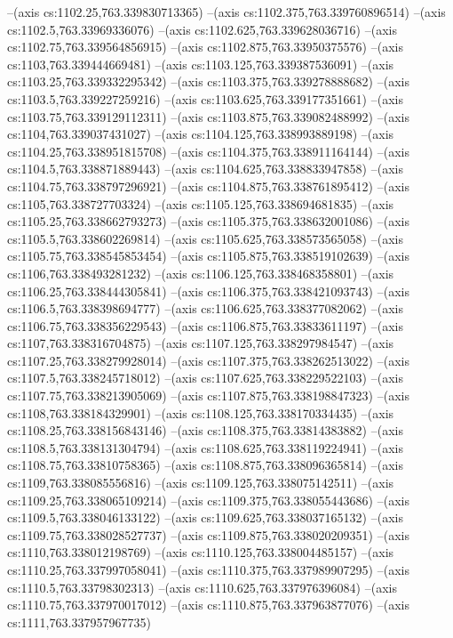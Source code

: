 --(axis cs:1102.25,763.339830713365)
--(axis cs:1102.375,763.339760896514)
--(axis cs:1102.5,763.33969336076)
--(axis cs:1102.625,763.339628036716)
--(axis cs:1102.75,763.339564856915)
--(axis cs:1102.875,763.33950375576)
--(axis cs:1103,763.339444669481)
--(axis cs:1103.125,763.339387536091)
--(axis cs:1103.25,763.339332295342)
--(axis cs:1103.375,763.339278888682)
--(axis cs:1103.5,763.339227259216)
--(axis cs:1103.625,763.339177351661)
--(axis cs:1103.75,763.339129112311)
--(axis cs:1103.875,763.339082488992)
--(axis cs:1104,763.339037431027)
--(axis cs:1104.125,763.338993889198)
--(axis cs:1104.25,763.338951815708)
--(axis cs:1104.375,763.338911164144)
--(axis cs:1104.5,763.338871889443)
--(axis cs:1104.625,763.338833947858)
--(axis cs:1104.75,763.338797296921)
--(axis cs:1104.875,763.338761895412)
--(axis cs:1105,763.338727703324)
--(axis cs:1105.125,763.338694681835)
--(axis cs:1105.25,763.338662793273)
--(axis cs:1105.375,763.338632001086)
--(axis cs:1105.5,763.338602269814)
--(axis cs:1105.625,763.338573565058)
--(axis cs:1105.75,763.338545853454)
--(axis cs:1105.875,763.338519102639)
--(axis cs:1106,763.338493281232)
--(axis cs:1106.125,763.338468358801)
--(axis cs:1106.25,763.338444305841)
--(axis cs:1106.375,763.338421093743)
--(axis cs:1106.5,763.338398694777)
--(axis cs:1106.625,763.338377082062)
--(axis cs:1106.75,763.338356229543)
--(axis cs:1106.875,763.33833611197)
--(axis cs:1107,763.338316704875)
--(axis cs:1107.125,763.338297984547)
--(axis cs:1107.25,763.338279928014)
--(axis cs:1107.375,763.338262513022)
--(axis cs:1107.5,763.338245718012)
--(axis cs:1107.625,763.338229522103)
--(axis cs:1107.75,763.338213905069)
--(axis cs:1107.875,763.338198847323)
--(axis cs:1108,763.338184329901)
--(axis cs:1108.125,763.338170334435)
--(axis cs:1108.25,763.338156843146)
--(axis cs:1108.375,763.33814383882)
--(axis cs:1108.5,763.338131304794)
--(axis cs:1108.625,763.338119224941)
--(axis cs:1108.75,763.33810758365)
--(axis cs:1108.875,763.338096365814)
--(axis cs:1109,763.338085556816)
--(axis cs:1109.125,763.338075142511)
--(axis cs:1109.25,763.338065109214)
--(axis cs:1109.375,763.338055443686)
--(axis cs:1109.5,763.338046133122)
--(axis cs:1109.625,763.338037165132)
--(axis cs:1109.75,763.338028527737)
--(axis cs:1109.875,763.338020209351)
--(axis cs:1110,763.338012198769)
--(axis cs:1110.125,763.338004485157)
--(axis cs:1110.25,763.337997058041)
--(axis cs:1110.375,763.337989907295)
--(axis cs:1110.5,763.33798302313)
--(axis cs:1110.625,763.337976396084)
--(axis cs:1110.75,763.337970017012)
--(axis cs:1110.875,763.337963877076)
--(axis cs:1111,763.337957967735)
